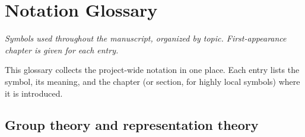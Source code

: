 
\chapter{Notation Glossary}
\label{ch:appx-notation}

\noindent\emph{Symbols used throughout the manuscript, organized by
topic.  First-appearance chapter is given for each entry.}

This glossary collects the project-wide notation in one place.
Each entry lists the symbol, its meaning, and the chapter (or
section, for highly local symbols) where it is introduced.

\section{Group theory and representation theory}
\label{sec:notation-group}

